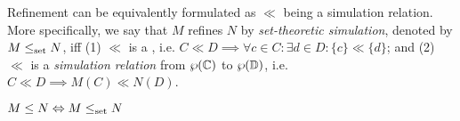 
Refinement can be equivalently formulated as $\ll$ being a simulation relation. More specifically, we say that $M$ refines $N$ by \textit{set-theoretic simulation}, denoted by $M \leq_{\textrm{set}} N$, iff (1) $\ll$ is a , i.e. $C \ll D \implies \forall c \in C: \exists d \in D: \{ c \} \ll \{ d \}$; and (2) $\ll$ is a \textit{simulation relation} from $\wp(\mathbb{C})$ to $\wp(\mathbb{D})$, i.e. $C \ll D \implies M(C) \ll N(D)$.




\begin{theorem} \label{thm:traj-equal-set}
$M \leq N \Leftrightarrow M \leq_{\textrm{set}} N$
\end{theorem}

\noindent {}
